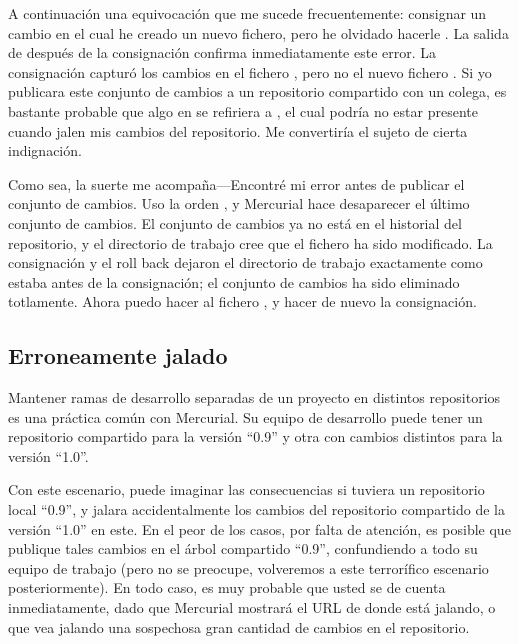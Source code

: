 A continuación una equivocación que me sucede frecuentemente:
consignar un cambio en el cual he creado un nuevo fichero, pero he
olvidado hacerle .
La salida de  después de la consignación confirma
inmediatamente este error.
La consignación capturó los cambios en el fichero , pero
no el nuevo fichero .  Si yo publicara este conjunto de
cambios a un repositorio compartido con un colega, es bastante
probable que algo en  se refiriera a , el cual
podría no estar presente cuando jalen mis cambios del repositorio.  Me
convertiría el sujeto de cierta indignación.

Como sea, la suerte me acompaña---Encontré mi error antes de publicar
el conjunto de cambios.  Uso la orden , y Mercurial
hace desaparecer el último conjunto de cambios.
El conjunto de cambios ya no está en el historial del repositorio, y el
directorio de trabajo cree que el fichero  ha sido
modificado.  La consignación y el roll back dejaron el directorio de
trabajo exactamente como estaba antes de la consignación; el conjunto
de cambios ha sido eliminado totlamente. Ahora puedo hacer 
al fichero , y hacer de nuevo la consignación.

\subsection{Erroneamente jalado}

Mantener ramas de desarrollo separadas de un proyecto en distintos
repositorios es una práctica común con Mercurial.  Su equipo de
desarrollo puede tener un repositorio compartido para la versión ``0.9''
y otra con cambios distintos para la versión ``1.0''.

Con este escenario, puede imaginar las consecuencias si tuviera un
repositorio local ``0.9'', y jalara accidentalmente los cambios del
repositorio compartido de la versión ``1.0'' en este.  En el peor de
los casos, por falta de atención, es posible que publique tales
cambios en el árbol compartido ``0.9'', confundiendo a todo su equipo
de trabajo (pero no se preocupe, volveremos a este terrorífico
escenario posteriormente).  En todo caso, es muy probable que usted se
de cuenta inmediatamente, dado que Mercurial mostrará el URL de donde
está jalando, o que vea jalando una sospechosa gran cantidad de
cambios en el repositorio.

